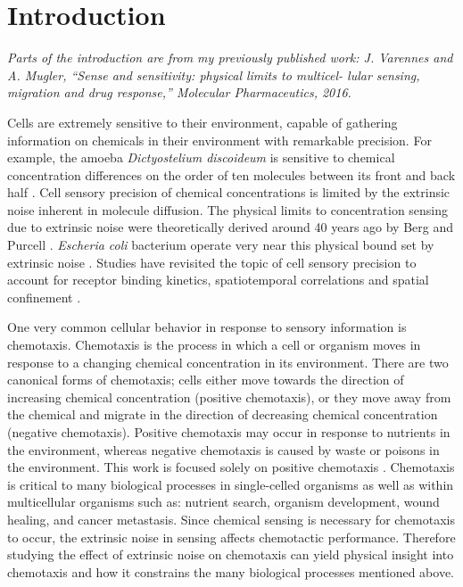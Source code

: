
\chapter{Introduction}

\noindent
\textit{Parts of the introduction are from my previously published work: J. Varennes and A. Mugler, “Sense and sensitivity: physical limits to multicel-
lular sensing, migration and drug response,” Molecular Pharmaceutics, 2016.}

Cells are extremely sensitive to their environment, capable of gathering information on chemicals in their environment with remarkable precision. For example, the amoeba \textit{Dictyostelium discoideum} is sensitive to chemical concentration differences on the order of ten molecules between its front and back half \cite{song2006dictyostelium}. Cell sensory precision of chemical concentrations is limited by the extrinsic noise inherent in molecule diffusion. The physical limits to concentration sensing due to extrinsic noise were theoretically derived around 40 years ago by Berg and Purcell \cite{berg1977physics}. \textit{Escheria coli} bacterium operate very near this physical bound set by extrinsic noise \red{[CITE]} \cite{lan2012energy}. Studies have revisited the topic of cell sensory precision to account for receptor binding kinetics, spatiotemporal correlations and spatial confinement
\cite{bialek2005physical, kaizu2014berg, bicknell2015limits}.

One very common cellular behavior in response to sensory information is chemotaxis. Chemotaxis is the process in which a cell or organism moves in response to a changing chemical concentration in its environment. There are two canonical forms of chemotaxis; cells either move towards the direction of increasing chemical concentration (positive chemotaxis), or they move away from the chemical and migrate in the direction of decreasing chemical concentration (negative chemotaxis). Positive chemotaxis may occur in response to nutrients in the environment, whereas negative chemotaxis is caused by waste or poisons in the environment. This work is focused solely on positive chemotaxis \red{[CITE]}. Chemotaxis is critical to many biological processes in single-celled organisms as well as within multicellular organisms such as: nutrient search, organism development, wound healing, and cancer metastasis. Since chemical sensing is necessary for chemotaxis to occur, the extrinsic noise in sensing affects chemotactic performance. Therefore studying the effect of extrinsic noise on chemotaxis can yield physical insight into chemotaxis and how it constrains the many biological processes mentioned above.

